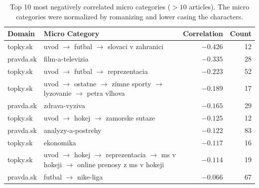 \documentclass[11pt,a4paper]{article}
\begin{document}
\begin{table}[H]
	\centering
	\small
	\begin{tabular}{@{}lp{9cm}rr@{}}
		\toprule
		\textbf{Domain} & \textbf{Micro Category}                                                                                                   & \textbf{Correlation} & \textbf{Count} \\ \midrule
		topky.sk        & uvod $\rightarrow$ futbal $\rightarrow$ slovaci v zahranici                                                               & $-0.426$             & 12             \\
		pravda.sk       & film-a-televizia                                                                                                          & $-0.335$             & 28             \\
		topky.sk        & uvod $\rightarrow$ futbal $\rightarrow$ reprezentacia                                                                     & $-0.223$             & 52             \\
		topky.sk        & uvod $\rightarrow$ ostatne $\rightarrow$ zimne sporty $\rightarrow$ lyzovanie $\rightarrow$ petra vlhova                  & $-0.189$             & 17             \\
		pravda.sk       & zdrava-vyziva                                                                                                             & $-0.165$             & 29             \\
		topky.sk        & uvod $\rightarrow$ hokej $\rightarrow$ zamorske sutaze                                                                    & $-0.125$             & 12             \\
		pravda.sk       & analyzy-a-postrehy                                                                                                        & $-0.122$             & 83             \\
		topky.sk        & ekonomika                                                                                                                 & $-0.117$             & 16             \\
		topky.sk        & uvod $\rightarrow$ hokej $\rightarrow$ reprezentacia $\rightarrow$ ms v hokeji $\rightarrow$ online prenosy z ms v hokeji & $-0.114$             & 19             \\
		pravda.sk       & futbal $\rightarrow$ nike-liga                                                                                            & $-0.066$             & 67             \\ \bottomrule
	\end{tabular}
	\caption{Top 10 most negatively correlated micro categories ($> 10$ articles). The micro categories were normalized by romanizing and lower casing the characters.}
	\label{tab:neg_core_10_micro}
\end{table}
\end{document}
